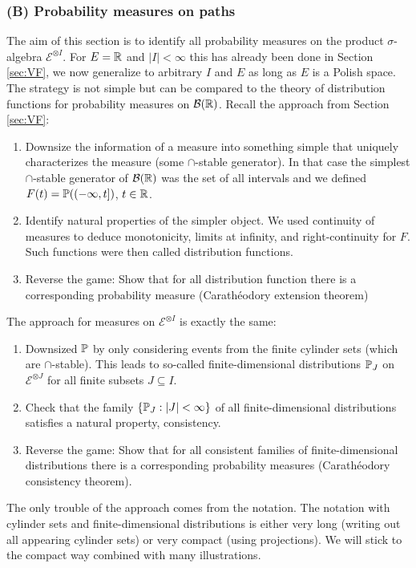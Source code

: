 \subsubsection{(B) Probability measures on paths}
The aim of this section is to identify all probability measures on the product $\sigma$-algebra $\mathcal E^{\otimes I}$. For $E=\R$ and $|I|<\infty$ this has already been done in Section \ref{sec:VF}, we now generalize to arbitrary $I$ and $E$ as long as $E$ is a Polish space. The strategy is not simple but can be compared to the theory of distribution functions for probability measures on $\mathcal B(\R)$. Recall the approach from Section \ref{sec:VF}:
\begin{enumerate}[label=(\roman*)]
	\item Downsize the information of a measure into something simple that uniquely characterizes the measure (some $\cap$-stable generator). In that case the simplest $\cap$-stable generator of $\mathcal B(\R)$ was the set of all intervals and we defined $F(t)=\P((-\infty,t])$, $t\in\R$.
	\item Identify natural properties of the simpler object. We used continuity of measures to deduce monotonicity, limits at infinity, and right-continuity for $F$. Such functions were then called distribution functions.
	\item Reverse the game: Show that for all distribution function there is a corresponding probability measure (Carath\'eodory extension theorem)
\end{enumerate}
The approach for measures on $\mathcal E^{\otimes I}$ is exactly the same:
\begin{enumerate}[label=(\roman*)]
	\item Downsized $\P$ by only considering events from the finite cylinder sets (which are $\cap$-stable). This leads to so-called finite-dimensional distributions $\P_J$ on $\mathcal E^{\otimes J}$ for all finite subsets $J\subseteq I$.
	\item Check that the family $\{\P_J: |J|<\infty\}$ of all finite-dimensional distributions satisfies a natural property, consistency.
	\item Reverse the game: Show that for all consistent families of finite-dimensional distributions there is a corresponding probability measures (Carath\'eodory consistency theorem).
\end{enumerate}
The only trouble of the approach comes from the notation. The notation with cylinder sets and finite-dimensional distributions is either very long (writing out all appearing cylinder sets) or very compact (using projections). We will stick to the compact way combined with many illustrations.\smallskip


